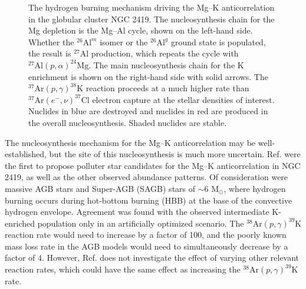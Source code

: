 \begin{figure}[t]
\begin{minipage}{.44\linewidth}
\begin{tikzpicture}[scale=1.5, every node/.style={transform shape}]
\end{tikzpicture}
\end{minipage}
\vspace{0.75 cm}
\caption{\label{fig:MgKHBurning}The hydrogen burning mechanism driving the Mg--K anticorrelation in the globular cluster NGC 2419. The nucleosynthesis chain for the Mg depletion is the Mg--Al cycle, shown on the left-hand side. Whether the $^{26}\mathrm{Al}^{m}$ isomer or the $^{26}\mathrm{Al}^{g}$ ground state is populated, the result is $^{27}$Al production, which repeats the cycle with $^{27}\mathrm{Al}(p,\alpha)^{24}\mathrm{Mg}$. The main nucleosynthesis chain for the K enrichment is shown on the right-hand side with solid arrows. The $^{37}\mathrm{Ar}(p, \gamma)^{38}\mathrm{K}$ reaction proceeds at a much higher rate than $^{37}\mathrm{Ar}(e^{-},\nu)^{37}\mathrm{Cl}$ electron capture at the stellar densities of interest. Nuclides in blue are destroyed and nuclides in red are produced in the overall nucleosynthesis. Shaded nuclides are stable.}
\end{figure}


The nucleosynthesis mechanism for the Mg--K anticorrelation may be well-established, but the site of this nucleosynthesis is much more uncertain. Ref. \cite{Ventura2012} were the first to propose polluter star candidates for the Mg--K anticorrelation in NGC 2419, as well as the other observed abundance patterns. Of consideration were massive AGB stars and Super-AGB (SAGB) stars of $\sim 6$ $\mathrm{M}_{\odot}$, where hydrogen burning occurs during hot-bottom burning (HBB) at the base of the convective hydrogen envelope. Agreement was found with the observed intermediate K-enriched population only in an artificially optimized scenario. The $^{38}\mathrm{Ar}(p,\gamma)^{39}\mathrm{K}$ reaction rate would need to increase by a factor of 100, and the poorly known mass loss rate in the AGB models would need to simultaneously decrease by a factor of 4. However, Ref. \cite{Ventura2012} does not investigate the effect of varying other relevant reaction rates, which could have the same effect as increasing the $^{38}\mathrm{Ar}(p,\gamma)^{39}\mathrm{K}$ rate.


